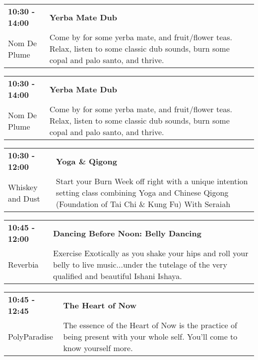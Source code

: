 \begin{tabular}{ p{1in} p{2.2in} }
    \textbf{10:30 - 14:00} & \textbf{Yerba Mate Dub} \\
    Nom De Plume \newline  & Come by for some yerba mate, and fruit/flower teas. Relax, listen to some classic dub sounds, burn some copal and palo santo, and thrive. \\
    \hline 
\end{tabular}
    
\begin{tabular}{ p{1in} p{2.2in} }
    \textbf{10:30 - 14:00} & \textbf{Yerba Mate Dub} \\
    Nom De Plume \newline  & Come by for some yerba mate, and fruit/flower teas. Relax, listen to some classic dub sounds, burn some copal and palo santo, and thrive. \\
    \hline 
\end{tabular}
    
\begin{tabular}{ p{1in} p{2.2in} }
    \textbf{10:30 - 12:00} & \textbf{Yoga \& Qigong} \\
    Whiskey and Dust \newline  & Start your Burn Week off right with a unique intention setting class combining Yoga and Chinese Qigong (Foundation of Tai Chi \& Kung Fu) With Seraiah \\
    \hline 
\end{tabular}
    
\begin{tabular}{ p{1in} p{2.2in} }
    \textbf{10:45 - 12:00} & \textbf{Dancing Before Noon: Belly Dancing} \\
    Reverbia \newline  & Exercise Exotically as you shake your hips and roll your belly to live music...under the tutelage of the very qualified and beautiful Ishani Ishaya. \\
    \hline 
\end{tabular}
    
\begin{tabular}{ p{1in} p{2.2in} }
    \textbf{10:45 - 12:45} & \textbf{The Heart of Now} \\
    PolyParadise \newline  & The essence of the Heart of Now is the practice of being present with your whole self. You'll come to know yourself more. \\
    \hline 
\end{tabular}
    

